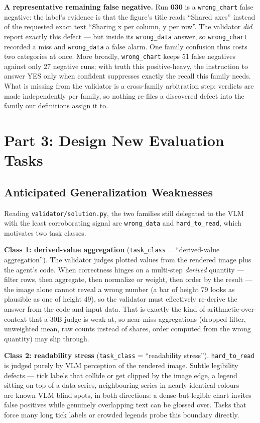 \documentclass[11pt]{article}
\begin{document}
\textbf{A representative remaining false negative.} Run \textbf{030} is a
\texttt{wrong\_chart} false negative: the label's evidence is that the
figure's title reads ``Shared axes'' instead of the requested exact text
``Sharing x per column, y per row''. The validator \emph{did} report exactly
this defect --- but inside its \texttt{wrong\_data} answer, so
\texttt{wrong\_chart} recorded a miss and \texttt{wrong\_data} a false
alarm. One family confusion thus costs two categories at once. More broadly,
\texttt{wrong\_chart} keeps 51 false negatives against only 27 negative
runs; with truth this positive-heavy, the instruction to answer YES only
when confident suppresses exactly the recall this family needs. What is
missing from the validator is a cross-family arbitration step: verdicts are
made independently per family, so nothing re-files a discovered defect into
the family our definitions assign it to.

\section{Part 3: Design New Evaluation Tasks}

\subsection{Anticipated Generalization Weaknesses}
Reading \texttt{validator/solution.py}, the two families still delegated to
the VLM with the least corroborating signal are \texttt{wrong\_data} and
\texttt{hard\_to\_read}, which motivates two task classes.

\textbf{Class 1: derived-value aggregation} (\texttt{task\_class} =
``derived-value aggregation''). The validator judges plotted values from the
rendered image plus the agent's code. When correctness hinges on a multi-step
\emph{derived} quantity --- filter rows, then aggregate, then normalize or
weight, then order by the result --- the image alone cannot reveal a wrong
number (a bar of height 79 looks as plausible as one of height 49), so the
validator must effectively re-derive the answer from the code and input data.
That is exactly the kind of arithmetic-over-context that a 30B judge is weak
at, so near-miss aggregations (dropped filter, unweighted mean, raw counts
instead of shares, order computed from the wrong quantity) may slip through.

\textbf{Class 2: readability stress} (\texttt{task\_class} = ``readability
stress''). \texttt{hard\_to\_read} is judged purely by VLM perception of the
rendered image. Subtle legibility defects --- tick labels that collide or get
clipped by the image edge, a legend sitting on top of a data series,
neighbouring series in nearly identical colours --- are known VLM blind
spots, in both directions: a dense-but-legible chart invites false positives
while genuinely overlapping text can be glossed over. Tasks that force many
long tick labels or crowded legends probe this boundary directly.
\end{document}
